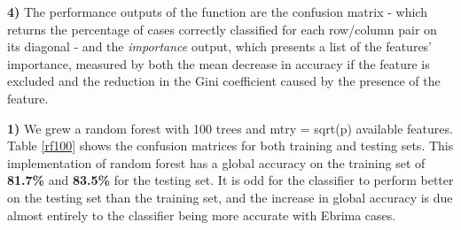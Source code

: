 \documentclass{homework}
\begin{document}
\textbf{4)} The performance outputs of the function are the confusion matrix - which returns the percentage of cases correctly classified for each row/column pair on its diagonal - and the \textit{importance} output, which presents a list of the features' importance, measured by both the mean decrease in accuracy if the feature is excluded and the reduction in the Gini coefficient caused by the presence of the feature. 

\question %
\textbf{1)} We grew a random forest with 100 trees and mtry = sqrt(p) available features. Table \ref{rf100} shows the confusion matrices for both training and testing sets. This implementation of random forest has a global accuracy on the training set of \textbf{81.7\%} and \textbf{83.5\%} for the testing set. It is odd for the classifier to perform better on the testing set than the training set, and the increase in global accuracy is due almost entirely to the classifier being more accurate with Ebrima cases.

\begin{table}[H]
    \centering
    \\
    \caption{Confusion Matrices for 100 Trees, mtry=sqrt(p)}
    \label{rf100}
\end{table}
\end{document}
